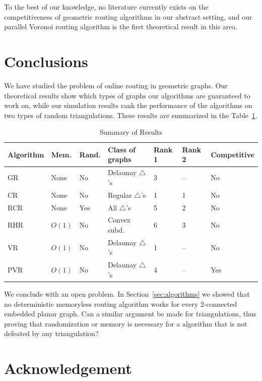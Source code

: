 \documentclass[final]{siamltex}
\newcommand{\seclabel}[1]{\label{sec:#1}}
\newcommand{\secref}[1]{\mbox{Section~\ref{sec:#1}}}
\newcommand{\tablabel}[1]{\label{tab:#1}}
\newcommand{\tabref}[1]{Table~\ref{tab:#1}}
\begin{document}
To the best of our knowledge, no literature currently exists on the
competitiveness of geometric routing algorithms in our abstract
setting, and our parallel Voronoi routing algorithm is the first
theoretical result in this area.  

\section{Conclusions}\seclabel{conclusions}

We have studied the problem of online routing in geometric graphs. Our
theoretical results show which types of graphs our algorithms are
guaranteed to work on, while our simulation results rank the
performance of the algorithms on two types of random triangulations.
These results are summarized in the \tabref{summary}.

\begin{table}
\begin{center}
\footnotesize
\begin{tabular}{|l|l|l|l|l|l|l|}\hline
Algorithm & Mem. & Rand. & Class of graphs & Rank 1 & Rank 2  
					& Competitive \\ \hline\hline
GR & None & No & Delaunay $\triangle$'s & 3 & -- & No \\
CR & None & No & Regular $\triangle$'s & 1 & 1 & No \\
RCR & None & Yes & All $\triangle$'s &      5 & 2 & No \\
RHR & $O(1)$ & No & Convex subd. & 6 & 3 & No \\
VR & $O(1)$  & No & Delaunay $\triangle$'s & 1 & -- & No\\
PVR & $O(1)$ & No & Delaunay $\triangle$'s & 4 & -- & Yes\\ \hline
\end{tabular}
\end{center}
\caption{Summary of Results}\tablabel{summary}
\end{table}

We conclude with an open problem. In \secref{algorithms} we
showed that no deterministic memoryless routing algorithm works for
every 2-connected embedded planar graph.  Can a similar argument be
made for triangulations, thus proving that randomization or memory is
necessary for a algorithm that is not defeated by any triangulation?

\section*{Acknowledgement}
\end{document}
